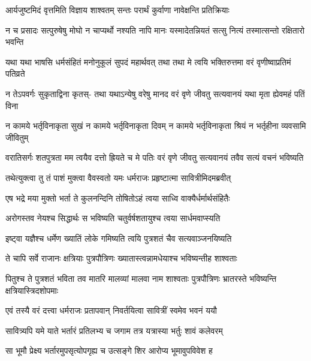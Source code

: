 \begin{center}
\twolineshloka
{आर्यजुष्टमिदं वृत्तमिति विज्ञाय शाश्वतम्}
{सन्तः परार्थं कुर्वाणा नावेक्षन्ति प्रतिक्रियाः}

\fourlineindentedshloka
{न च प्रसादः सत्पुरुषेषु मोघो}
{न चाप्यर्थो नश्यति नापि मानः}
{यस्मादेतन्नियतं सत्सु नित्यं}
{तस्मात्सन्तो रक्षितारो भवन्ति}


\fourlineindentedshloka
{यथा यथा भाषसि धर्मसंहितं}
{मनोनुकूलं सुपदं महार्थवत्}
{तथा तथा मे त्वयि भक्तिरुत्तमा}
{वरं वृणीष्वाप्रतिमं पतिव्रते}


\fourlineindentedshloka
{न तेऽपवर्गः सुकृताद्विना कृतस्-}
{तथा यथाऽन्येषु वरेषु मानद}
{वरं वृणे जीवतु सत्यवानयं}
{यथा मृता ह्येवमहं पतिं विना}

\fourlineindentedshloka
{न कामये भर्तृविनाकृता सुखं}
{न कामये भर्तृविनाकृता दिवम्}
{न कामये भर्तृविनाकृता श्रियं}
{न भर्तृहीना व्यवसामि जीवितुम्}

\fourlineindentedshloka
{वरातिसर्गः शतपुत्रता मम}
{त्वयैव दत्तो ह्रियते च मे पतिः}
{वरं वृणे जीवतु सत्यवानयं}
{तवैव सत्यं वचनं भविष्यति}


\twolineshloka
{तथेत्युक्त्वा तु तं पाशं मुक्त्वा वैवस्वतो यमः}
{धर्मराजः प्रहृष्टात्मा सावित्रीमिदमब्रवीत्}

\uvacha{[यम उवाच]}

\twolineshloka
{एष भद्रे मया मुक्तो भर्ता ते कुलनन्दिनि}
{तोषितोऽहं त्वया साध्वि वाक्यैर्धर्मार्थसंहितैः}

\twolineshloka
{अरोगस्तव नेयश्च सिद्धार्थः स भविष्यति}
{चतुर्वर्षशतायुश्च त्वया सार्धमवाप्स्यति}

\twolineshloka
{इष्ट्वा यज्ञैश्च धर्मेण ख्यातिं लोके गमिष्यति}
{त्वयि पुत्रशतं चैव सत्यवाञ्जनयिष्यति}

\twolineshloka
{ते चापि सर्वे राजानः क्षत्रियाः पुत्रपौत्रिणः}
{ख्यातास्त्वन्नामधेयाश्च भविष्यन्तीह शाश्वताः}

\threelineshloka
{पितुश्च ते पुत्रशतं भविता तव मातरि}
{मालव्यां मालवा नाम शाश्वताः पुत्रपौत्रिणः}
{भ्रातरस्ते भविष्यन्ति क्षत्रियास्त्रिदशोपमाः}

\twolineshloka
{एवं तस्यै वरं दत्त्वा धर्मराजः प्रतापवान्}
{निवर्तयित्वा सावित्रीं स्वमेव भवनं ययौ}

\twolineshloka
{सावित्र्यपि यमे याते भर्तारं प्रतिलभ्य च}
{जगाम तत्र यत्रास्या भर्तुः शावं कलेवरम्}

\twolineshloka
{सा भूमौ प्रेक्ष्य भर्तारमुपसृत्योपगृह्य च}
{उत्सङ्गे शिर आरोप्य भूमावुपविवेश ह}


\end{center}
